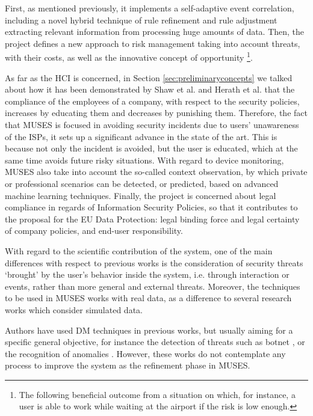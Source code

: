 First, as mentioned previously, it  implements a self-adaptive event correlation, including a novel hybrid technique of rule refinement and rule adjustment extracting relevant information from processing huge amounts of data. Then, the project defines a new approach to risk management taking into account threats, with their costs, as well as the innovative concept of opportunity \footnote{The following beneficial outcome from a situation on which, for instance, a user is able to work while waiting at the airport if the risk is low enough.}. 

As far as the HCI is concerned, in Section \ref{sec:preliminaryconcepts} we talked about how it has been demonstrated by Shaw et al. \cite{SecPolComp09} and Herath et al. \cite{SecPolPenalty09} that the compliance of the employees of a company, with respect to the security policies, increases by educating them and decreases by punishing them. Therefore, the fact that MUSES is focused in avoiding security incidents due to users' unawareness of the ISPs, it sets up a significant advance in the state of the art. This is because not only the incident is avoided, but the user is educated, which at the same time avoids future risky situations.
With regard to device monitoring, MUSES  also take into account the so-called context observation, by which private or professional scenarios can be detected, or predicted, based on advanced machine learning techniques. Finally, the project is concerned about legal compliance in regards of Information Security Policies, so that it  contributes to the proposal for the EU Data Protection: legal binding force and legal certainty of company policies, and end-user responsibility.

With regard to the scientific contribution of the system, one of the main differences with respect to previous works is the consideration of security threats `brought' by the user's behavior inside the system, i.e. through interaction or events, rather than more general and external threats. Moreover, the techniques to be used in MUSES  works with real data, as a difference to several research works which consider simulated data.

Authors have used DM techniques in previous works, but usually aiming for a specific general objective, for instance the detection of threats such as botnet \cite{botnet_detection_clustering_09}, or the recognition of anomalies \cite{feature_selection_anomalies_08}. However, these works do not contemplate any process to improve the system as the refinement phase in MUSES.

